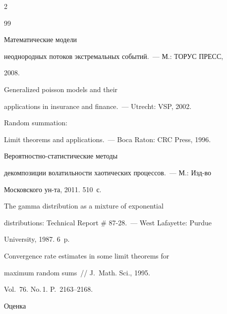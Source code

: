 \begin{multicols}{2}
{{\begin{thebibliography}{99}


 Математические модели


неоднородных потоков экстремальных событий.~--- М.: ТОРУС ПРЕСС,


2008.







 Generalized poisson models and their


applications in insurance and finance.~--- Utrecht: VSP, 2002.







 Random summation:


Limit theorems and applications.~--- Boca Raton: CRC Press, 1996.







 Ве\-ро\-ят\-но\-ст\-но-ста\-ти\-сти\-че\-ские методы


декомпозиции волатильности хаотических процессов.~--- М.: Изд-во


Московского ун-та, 2011. 510~с.







 The gamma distribution as a mixture of exponential


distributions: Technical Report \# 87-28.~--- West Lafayette: Purdue


University, 1987. 6~p.









Convergence rate estimates in some limit theorems for


maximum random sums~// J.~Math. Sci., 1995.


Vol.~76. No.\,1. P.~2163--2168.







 Оценка



\end{thebibliography}}}
\end{multicols}
